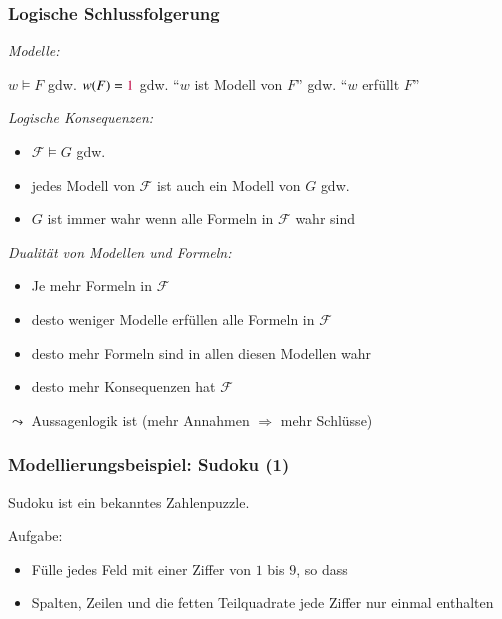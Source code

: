 \documentclass[aspectratio=1610,onlymath]{beamer}
\begin{document}
\begin{frame}\frametitle{Logische Schlussfolgerung}

\emph{Modelle:}\smallskip

$w\models F$ \alert{gdw.} $w(F)=\textcolor{purple}{1}$ \alert{gdw.} "`$w$ ist Modell von $F$"' \alert{gdw.} "`$w$ erfüllt $F$"'
\bigskip

\emph{Logische Konsequenzen:}
\begin{itemize}
\item $\mathcal{F}\models G$ \alert{gdw.}
\item jedes Modell von $\mathcal{F}$ ist auch ein Modell von $G$ \alert{gdw.}
\item $G$ ist immer wahr wenn alle Formeln in $\mathcal{F}$ wahr sind
\end{itemize}\pause

\emph{Dualität von Modellen und Formeln:}
\begin{itemize}
\item Je mehr Formeln in $\mathcal{F}$
\item desto weniger Modelle erfüllen alle Formeln in $\mathcal{F}$
\item desto mehr Formeln sind in allen diesen Modellen wahr
\item desto mehr Konsequenzen hat $\mathcal{F}$
\end{itemize}
$\leadsto$ Aussagenlogik ist  (mehr Annahmen $\Rightarrow$ mehr Schlüsse)

\end{frame}

\begin{frame}\frametitle{Modellierungsbeispiel: Sudoku (1)}

Sudoku ist ein bekanntes Zahlenpuzzle.
\bigskip


Aufgabe: 
\begin{itemize}
\item Fülle jedes Feld mit einer Ziffer von $1$ bis $9$, so dass
\item Spalten, Zeilen und die fetten Teilquadrate jede Ziffer nur einmal enthalten
\end{itemize}

\end{frame}
\end{document}
